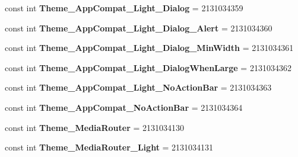 \begin{DoxyCompactItemize}
\item 
\hypertarget{classClient_1_1Droid_1_1Resource_1_1Style_a644889c1f3975fa82653f840529f69db}{}const int {\bfseries Theme\+\_\+\+App\+Compat\+\_\+\+Light\+\_\+\+Dialog} = 2131034359\label{classClient_1_1Droid_1_1Resource_1_1Style_a644889c1f3975fa82653f840529f69db}

\item 
\hypertarget{classClient_1_1Droid_1_1Resource_1_1Style_aeb5311166932984976718b4a35347040}{}const int {\bfseries Theme\+\_\+\+App\+Compat\+\_\+\+Light\+\_\+\+Dialog\+\_\+\+Alert} = 2131034360\label{classClient_1_1Droid_1_1Resource_1_1Style_aeb5311166932984976718b4a35347040}

\item 
\hypertarget{classClient_1_1Droid_1_1Resource_1_1Style_a1b01a6bc04cef590561be1d2dd88c7ed}{}const int {\bfseries Theme\+\_\+\+App\+Compat\+\_\+\+Light\+\_\+\+Dialog\+\_\+\+Min\+Width} = 2131034361\label{classClient_1_1Droid_1_1Resource_1_1Style_a1b01a6bc04cef590561be1d2dd88c7ed}

\item 
\hypertarget{classClient_1_1Droid_1_1Resource_1_1Style_a58382a9133f9132bff315539b7e2ed7a}{}const int {\bfseries Theme\+\_\+\+App\+Compat\+\_\+\+Light\+\_\+\+Dialog\+When\+Large} = 2131034362\label{classClient_1_1Droid_1_1Resource_1_1Style_a58382a9133f9132bff315539b7e2ed7a}

\item 
\hypertarget{classClient_1_1Droid_1_1Resource_1_1Style_ab9b1b677bd306c7eba103bc81b22345c}{}const int {\bfseries Theme\+\_\+\+App\+Compat\+\_\+\+Light\+\_\+\+No\+Action\+Bar} = 2131034363\label{classClient_1_1Droid_1_1Resource_1_1Style_ab9b1b677bd306c7eba103bc81b22345c}

\item 
\hypertarget{classClient_1_1Droid_1_1Resource_1_1Style_a049f0007851578ce0eb4401e4356252e}{}const int {\bfseries Theme\+\_\+\+App\+Compat\+\_\+\+No\+Action\+Bar} = 2131034364\label{classClient_1_1Droid_1_1Resource_1_1Style_a049f0007851578ce0eb4401e4356252e}

\item 
\hypertarget{classClient_1_1Droid_1_1Resource_1_1Style_a4511d026b6835bbfea0169e913dc654c}{}const int {\bfseries Theme\+\_\+\+Media\+Router} = 2131034130\label{classClient_1_1Droid_1_1Resource_1_1Style_a4511d026b6835bbfea0169e913dc654c}

\item 
\hypertarget{classClient_1_1Droid_1_1Resource_1_1Style_a8393a0600444c4263ffbb444a3f6e3ec}{}const int {\bfseries Theme\+\_\+\+Media\+Router\+\_\+\+Light} = 2131034131\label{classClient_1_1Droid_1_1Resource_1_1Style_a8393a0600444c4263ffbb444a3f6e3ec}


\end{DoxyCompactItemize}

